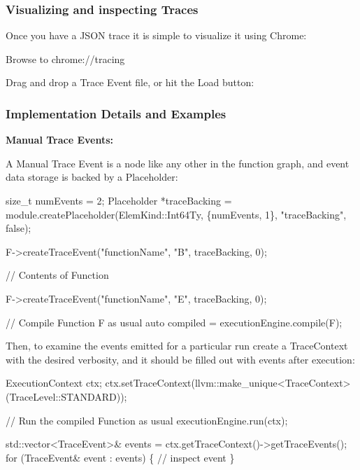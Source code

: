 \subsubsection*{Visualizing and inspecting Traces}

Once you have a J\+S\+ON trace it is simple to visualize it using Chrome\+:


\begin{DoxyEnumerate}
\item Browse to {\ttfamily chrome\+://tracing}
\item Drag and drop a Trace Event file, or hit the Load button\+:
\item 
\end{DoxyEnumerate}

\subsubsection*{Implementation Details and Examples}

\label{_examples}%


{\bfseries Manual Trace Events\+:}

A Manual Trace Event is a node like any other in the function graph, and event data storage is backed by a Placeholder\+:


\begin{DoxyCode}
size\_t numEvents = 2;
Placeholder *traceBacking = module.createPlaceholder(ElemKind::Int64Ty,
    \{numEvents, 1\}, "traceBacking", false);

F->createTraceEvent("functionName", "B", traceBacking, 0);

// Contents of Function

F->createTraceEvent("functionName", "E", traceBacking, 0);

// Compile Function F as usual
auto compiled = executionEngine.compile(F);
\end{DoxyCode}


Then, to examine the events emitted for a particular run create a Trace\+Context with the desired verbosity, and it should be filled out with events after execution\+:


\begin{DoxyCode}
ExecutionContext ctx;
ctx.setTraceContext(llvm::make\_unique<TraceContext>(TraceLevel::STANDARD));

// Run the compiled Function as usual
executionEngine.run(ctx);

std::vector<TraceEvent>& events = ctx.getTraceContext()->getTraceEvents();
for (TraceEvent& event : events) \{
    // inspect event
\}
\end{DoxyCode}


